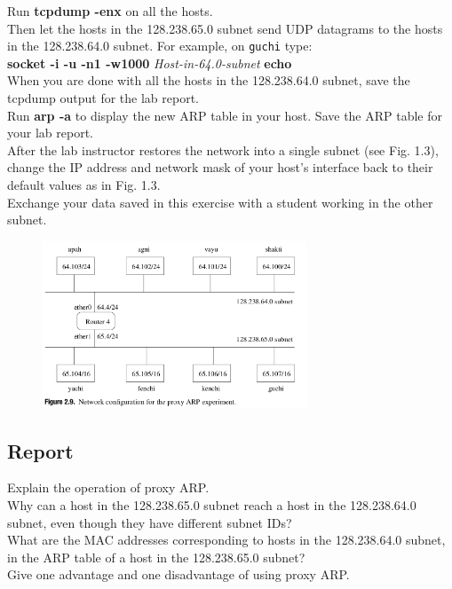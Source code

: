 \documentclass[10pt,a4paper]{article}
\numberwithin{equation}{section}
\numberwithin{figure}{section}
\numberwithin{table}{section}
\begin{document}
    Run \textbf{tcpdump -enx} on all the hosts. \\
    Then let the hosts in the 128.238.65.0 subnet send UDP datagrams to the hosts in the 128.238.64.0 subnet.
    For example, on \texttt{guchi} type: \\
    \textbf{socket -i -u -n1 -w1000} \textit{Host-in-64.0-subnet} \textbf{echo} \\
    When you are done with all the hosts in the 128.238.64.0 subnet, save the tcpdump output for the lab report. \\
    Run \textbf{arp -a} to display the new ARP table in your host.
    Save the ARP table for your lab report. \\
    After the lab instructor restores the network into a single subnet (see Fig. 1.3), change the IP address and network mask of your host’s interface back to their default values as in Fig. 1.3. \\
    Exchange your data saved in this exercise with a student working in the other subnet. \\
    \begin{figure}[H]
        \centering
        \includegraphics[width=0.7\textwidth]{img/figure2-9.png}
    \end{figure}
    \subsection*{Report}
    Explain the operation of proxy ARP. \\
    Why can a host in the 128.238.65.0 subnet reach a host in the 128.238.64.0 subnet, even though they have different subnet IDs? \\
    What are the MAC addresses corresponding to hosts in the 128.238.64.0 subnet, in the ARP table of a host in the 128.238.65.0 subnet? \\
    Give one advantage and one disadvantage of using proxy ARP.
\end{document}
